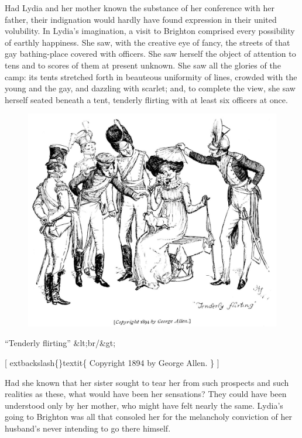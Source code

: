 \documentclass[10pt]{book}
\begin{document}
   Had Lydia and her mother known the substance of her conference with her
father, their indignation would hardly have found expression in their
united volubility. In Lydia’s imagination, a visit to Brighton comprised
every possibility of earthly happiness. She saw, with the creative eye
of fancy, the streets of that gay bathing-place covered with officers.
She saw herself the object of attention to tens and to scores of them at
present unknown. She saw all the glories of the camp: its
   tents
stretched forth in beauteous uniformity of lines, crowded with the young
and the gay, and dazzling with scarlet; and, to complete the view, she
saw herself seated beneath a tent, tenderly flirting with at least six
officers at once.
  

\begin{figure}[h]
\centering
\includegraphics[width=\linewidth]{images/i_319.jpg}
\end{figure}

     “Tenderly flirting”
     &lt;br/&gt;

     [
     	extbackslash\{\}textit\{
      Copyright 1894 by George Allen.
     \}
     ]
    

   Had she known that her sister sought to tear her from such prospects and
such realities as these, what would have been her sensations? They could
have been understood only by her mother, who might have felt nearly the
same. Lydia’s going to Brighton was all that consoled her for the
melancholy conviction of her husband’s never intending to go there
himself.
  
\end{document}
